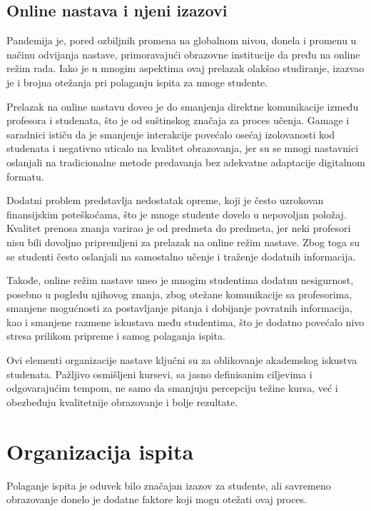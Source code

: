 \documentclass[a4paper]{article}
\begin{document}
\subsection{Online nastava i njeni izazovi}

Pandemija je, pored ozbiljnih promena na globalnom nivou, donela i promenu u načinu odvijanja nastave, primoravajući obrazovne institucije da pređu na online režim rada. Iako je u mnogim aspektima ovaj prelazak olakšao studiranje, izazvao je i brojna otežanja pri polaganju ispita za mnoge studente.

Prelazak na online nastavu doveo je do smanjenja direktne komunikacije između profesora i studenata, što je od suštinskog značaja za proces učenja. Gamage i saradnici \cite{gamage2022rethinking} ističu da je smanjenje interakcije povećalo osećaj izolovanosti kod studenata i negativno uticalo na kvalitet obrazovanja, jer su se mnogi nastavnici oslanjali na tradicionalne metode predavanja bez adekvatne adaptacije digitalnom formatu.

Dodatni problem predstavlja nedostatak opreme, koji je često uzrokovan finansijskim poteškoćama, što je mnoge studente dovelo u nepovoljan položaj. Kvalitet prenosa znanja varirao je od predmeta do predmeta, jer neki profesori nisu bili dovoljno pripremljeni za prelazak na online režim nastave. Zbog toga su se studenti često oslanjali na samostalno učenje i traženje dodatnih informacija.

Takođe, online režim nastave uneo je mnogim studentima dodatnu nesigurnost, posebno u pogledu njihovog znanja, zbog otežane komunikacije sa profesorima, smanjene mogućnosti za postavljanje pitanja i dobijanje povratnih informacija, kao i smanjene razmene iskustava među studentima, što je dodatno povećalo nivo stresa prilikom pripreme i samog polaganja ispita.

\vspace{8mm}

Ovi elementi organizacije nastave ključni su za oblikovanje akademskog iskustva studenata.
Pažljivo osmišljeni kursevi, sa jasno definisanim ciljevima i odgovarajućim tempom, ne samo
da smanjuju percepciju težine kursa, već i obezbeđuju kvalitetnije obrazovanje i bolje
rezultate.

\section{Organizacija ispita}

Polaganje ispita je oduvek bilo značajan izazov za studente, ali savremeno obrazovanje donelo je dodatne faktore koji mogu otežati ovaj proces.
\end{document}
